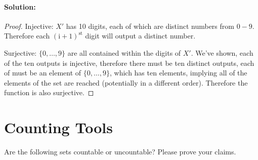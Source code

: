 \documentclass[11pt, notitlepage]{report}
\newcommand{\Question}[1]{\newpage\section{#1}}
\newenvironment{solution}{\paragraph{Solution:}}{\hfill}
\begin{document}
\begin{enumerate}[label=\alph*.)]
\begin{solution}
\begin{proof}
    		Injective: $X'$ has 10 digits, each of which are distinct numbers from $0-9$. Therefore each $(\text{i} + 1)^{\text{st}}$ digit will output a distinct number.
    		
    		Surjective: $\{0,\dots, 9\}$ are all contained within the digits of $X'$. We've shown, each of the ten outputs is injective, therefore there must be ten distinct outputs, each of must be an element of $\{0,\dots, 9\}$, which has ten elements, implying all of the elements of the set are reached (potentially in a different order). Therefore the function is also surjective.
    	\end{proof}
    \end{solution}
\end{enumerate}


\Question{Counting Tools}
Are the following sets countable or uncountable? Please prove your claims.
\end{document}
